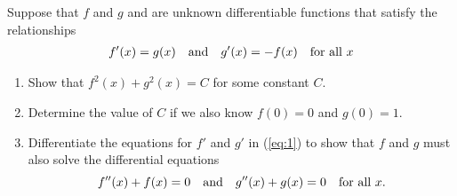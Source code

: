 \documentclass[12pt,letterpaper]{hmcpset}
\begin{document}
\begin{problem}[6]
  Suppose that $f$ and $g$ and are unknown differentiable functions that satisfy the relationships
  \begin{align} \label{eq:1}
    f'(x) = g(x) \text{\quad and\quad} g'(x) = -f(x) \text{\quad for all } x
  \end{align}
  \begin{enumerate}[label=(\alph*)]
  \item Show that $f^2(x) + g^2(x) = C$ for some constant $C$.
  \item Determine the value of $C$ if we also know $f(0) = 0$ and $g(0) = 1$.
  \item Differentiate the equations for $f'$ and $g'$ in (\ref{eq:1}) to show that $f$ and $g$ must also solve the differential equations
    \[ f''(x) + f(x) = 0 \text{\quad and\quad} g''(x) + g(x) = 0 \text{\quad for all } x. \]
  \end{enumerate}
\end{problem}
\begin{solution}

\end{solution}
\end{document}
